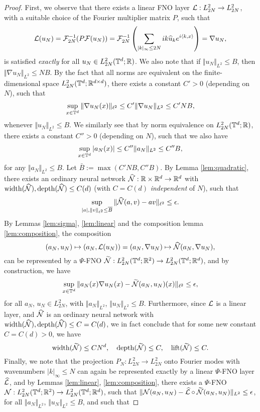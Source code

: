 \documentclass[reqno,a4paper]{amsart}
\begin{document}
\begin{proof}
First, we observe that there exists a linear FNO layer $\mathcal{L}: L^2_{2N} \to L^2_{2N}$, with a suitable choice of the Fourier multiplier matrix $P$, such that 
\[
\mathcal{L}(u_N) 
= \mathcal{F}^{-1}_{2N} (P \mathcal{F}(u_N)) 
= \mathcal{F}^{-1}_{2N} \left(\sum_{|k|_\infty\le 2N} ik \widehat{u}_k e^{i\langle k, x\rangle} \right)
= \nabla u_N,
\]
is satisfied \emph{exactly} for all $u_N\in L^2_{2N}(\mathbb{T}^d;\mathbb{R})$. We also note that if $\Vert u_N \Vert_{L^2} \le B$, then $\Vert \nabla u_N \Vert_{L^2}\le N B$. By the fact that all norms are equivalent on the finite-dimensional space $L^2_{2N}(\mathbb{T}^d;\mathbb{R}^{d\times d})$, there exists a constant $C'>0$ (depending on $N$), such that 
\[
\sup_{x\in \mathbb{T}^d} \Vert \nabla u_N(x) \Vert_{\ell^2} 
\le
C' \Vert \nabla u_N \Vert_{L^2} \le C'NB,
\]
whenever $\Vert u_N \Vert_{L^2}\le B$. We similarly see that by norm equivalence on $L^2_{2N}(\mathbb{T}^d;\mathbb{R})$, there exists a constant $C''>0$ (depending on $N$), such that we also have
\[
\sup_{x\in \mathbb{T}^d} | a_N(x) | \le C''\Vert a_N \Vert_{L^2} \le C''B,
\]
for any $\Vert a_N \Vert_{L^2}\le B$. Let $\bar{B} := \max(C'NB, C''B)$. By Lemma \ref{lem:quadratic}, there exists an ordinary neural network $\widehat{\mathcal{N}}: \mathbb{R}\times \mathbb{R}^d \to \mathbb{R}^d$ with $\mathrm{width}(\widehat{\mathcal{N}}), \mathrm{depth}(\widehat{\mathcal{N}}) \le C(d)$ (with $C=C(d)$ \emph{independent} of $N$), such that 
\[
\sup_{|a|, \Vert v \Vert_{\ell^2}\le \overline{B}}
\Vert 
\widehat{\mathcal{N}}(a,v) - av
\Vert_{\ell^2}
\le \epsilon.
\]
By Lemmas \ref{lem:sigma}, \ref{lem:linear} and the composition lemma \ref{lem:composition}, the composition 
\[
(a_N,u_N) \mapsto (a_N, \mathcal{L}(u_N))=(a_N, \nabla u_N) \mapsto \widehat{\mathcal{N}}(a_N,\nabla u_N),
\]
can be represented by a $\Psi$-FNO $\widetilde{\mathcal{N}}: L^2_{2N}(\mathbb{T}^d;\mathbb{R}^2) \to L^2_{2N}(\mathbb{T}^d;\mathbb{R}^d)$, and by construction, we have 
\begin{align} \label{eq:tN}
\sup_{x\in \mathbb{T}^d}
\Vert
a_N(x) \nabla u_N(x) - \widetilde{\mathcal{N}}(a_N,u_N)(x)
\Vert_{\ell^2}
\le 
\epsilon,
\end{align}
for all $a_N$, $u_N \in L^2_{2N}$, with $ \Vert a_N \Vert_{L^2}$, $\Vert u_N \Vert_{L^2} \le B$. Furthermore, since $\mathcal{L}$ is a linear layer, and $\widehat{\mathcal{N}}$ is an ordinary neural network with $\mathrm{width}(\widehat{\mathcal{N}}), \mathrm{depth}(\widehat{\mathcal{N}})\le C= C(d)$, we in fact conclude that for some new constant $C = C(d)>0$, we have
\[
\mathrm{width}(\widetilde{\mathcal{N}}) \le C N^d, 
\quad
\mathrm{depth}(\widetilde{\mathcal{N}}) \le C, 
\quad
\mathrm{lift}(\widetilde{\mathcal{N}}) \le C.
\]
Finally, we note that the projection $P_N: L^2_{2N} \to L^2_{2N}$ onto Fourier modes with wavenumbers $|k|_\infty \le N$ can again be represented exactly by a linear $\Psi$-FNO layer $\widehat{\mathcal{L}}$, and by Lemmas \ref{lem:linear}, \ref{lem:composition}, there exists a $\Psi$-FNO $\mathcal{N}: L^2_{2N}(\mathbb{T}^d;\mathbb{R}^2) \to L^2_{2N}(\mathbb{T}^d;\mathbb{R}^d)$, such that $\Vert \mathcal{N}(a_N,u_N) - \widehat{\mathcal{L}} \circ \widetilde{\mathcal{N}}(a_N,u_N) \Vert_{L^2} \le \epsilon$, for all $\Vert a_N \Vert_{L^2}$, $\Vert u_N \Vert_{L^2} \le B$, and such that 

\end{proof}
\end{document}
